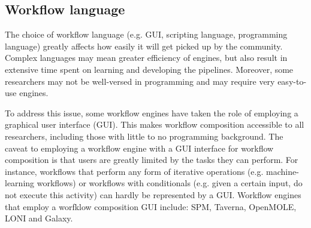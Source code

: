         \subsection{Workflow language}\label{lang} The choice of workflow
            language (e.g. GUI, scripting language, programming language)
            greatly affects how easily it will get picked up by the community.
            Complex languages may mean greater efficiency of engines, but also
            result in extensive time spent on learning and developing the
            pipelines. Moreover, some researchers may not be well-versed in
            programming and may require very easy-to-use engines.

            To address this issue, some workflow engines have taken the role of
            employing a graphical user interface (GUI). This makes workflow
            composition accessible to all researchers, including those with
            little to no programming background. The caveat to employing a
            workflow engine with a GUI interface for workflow composition is
            that users are greatly limited by the tasks they can perform. For
            instance, workflows that perform any form of iterative operations
            (e.g. machine-learning workflows) or workflows with conditionals
            (e.g. given a certain input, do not execute this activity) can
            hardly be represented by a GUI. Workflow engines that employ a
            worfklow composition GUI include: SPM, Taverna, OpenMOLE, LONI and
            Galaxy.

